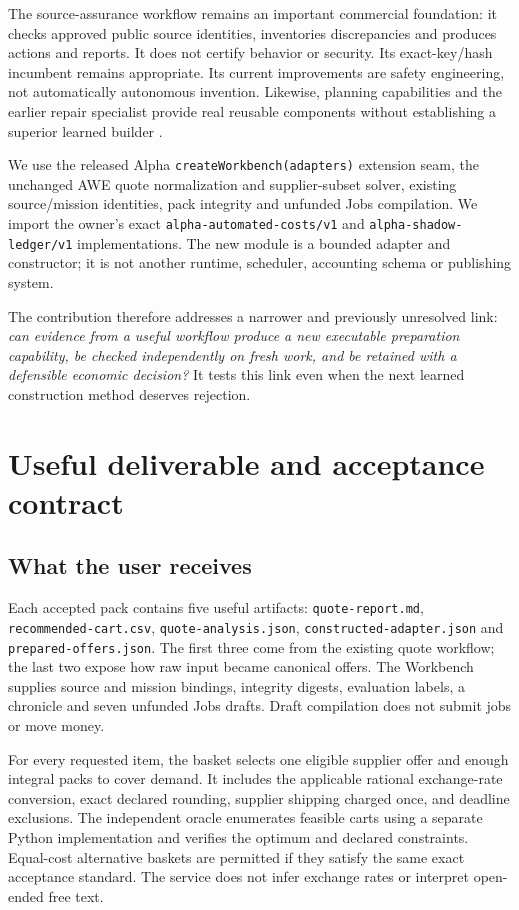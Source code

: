 \documentclass[11pt,letterpaper]{article}
\newcommand{\code}[1]{\texttt{\small #1}}
\begin{document}
The source-assurance workflow remains an important commercial foundation: it checks approved public source identities, inventories discrepancies and produces actions and reports. It does not certify behavior or security. Its exact-key/hash incumbent remains appropriate. Its current improvements are safety engineering, not automatically autonomous invention. Likewise, planning capabilities and the earlier repair specialist provide real reusable components without establishing a superior learned builder \cite{construction,capital}.

We use the released Alpha \code{createWorkbench(adapters)} extension seam, the unchanged AWE quote normalization and supplier-subset solver, existing source/mission identities, pack integrity and unfunded Jobs compilation. We import the owner's exact \code{alpha-automated-costs/v1} and \code{alpha-shadow-ledger/v1} implementations. The new module is a bounded adapter and constructor; it is not another runtime, scheduler, accounting schema or publishing system.

The contribution therefore addresses a narrower and previously unresolved link: \emph{can evidence from a useful workflow produce a new executable preparation capability, be checked independently on fresh work, and be retained with a defensible economic decision?} It tests this link even when the next learned construction method deserves rejection.

\section{Useful deliverable and acceptance contract}
\label{sec:deliverable}

\subsection{What the user receives}

Each accepted pack contains five useful artifacts: \code{quote-report.md}, \code{recommended-cart.csv}, \code{quote-analysis.json}, \code{constructed-adapter.json} and \code{prepared-offers.json}. The first three come from the existing quote workflow; the last two expose how raw input became canonical offers. The Workbench supplies source and mission bindings, integrity digests, evaluation labels, a chronicle and seven unfunded Jobs drafts. Draft compilation does not submit jobs or move money.

For every requested item, the basket selects one eligible supplier offer and enough integral packs to cover demand. It includes the applicable rational exchange-rate conversion, exact declared rounding, supplier shipping charged once, and deadline exclusions. The independent oracle enumerates feasible carts using a separate Python implementation and verifies the optimum and declared constraints. Equal-cost alternative baskets are permitted if they satisfy the same exact acceptance standard. The service does not infer exchange rates or interpret open-ended free text.
\end{document}
